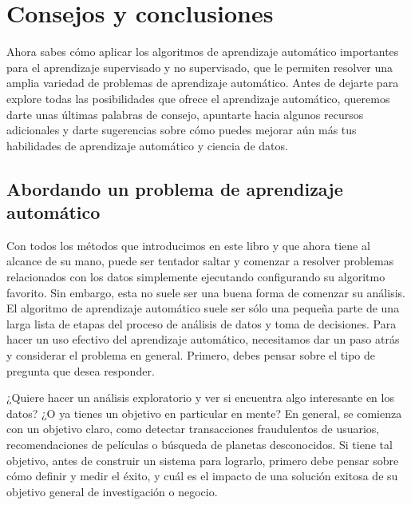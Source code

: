 


















\chapter{Consejos y conclusiones}


Ahora sabes cómo aplicar los algoritmos de aprendizaje automático importantes para el 
aprendizaje supervisado y no supervisado,  que le permiten resolver una amplia variedad 
de problemas de aprendizaje automático. Antes de dejarte para explore  todas las posibilidades 
que ofrece el aprendizaje automático, queremos darte unas últimas palabras de consejo, 
apuntarte hacia algunos recursos adicionales y darte sugerencias sobre cómo puedes
mejorar aún más tus habilidades de aprendizaje automático y ciencia de datos.\\



\section{Abordando un problema de aprendizaje automático}
	

Con todos los  métodos que introducimos  en este libro y que ahora tiene al alcance de su mano,
 puede ser tentador saltar y comenzar a resolver  problemas relacionados con los datos 
simplemente ejecutando configurando su algoritmo favorito. Sin embargo, esta no suele ser una buena forma de comenzar su análisis. El algoritmo de aprendizaje automático suele ser sólo una pequeña parte de 
 una larga lista de etapas del proceso de análisis de datos y toma de decisiones.
  Para hacer un uso efectivo del aprendizaje automático, necesitamos  dar un paso atrás y considerar el problema en general. Primero, debes  pensar sobre el tipo de pregunta que desea responder. 

¿Quiere hacer un análisis exploratorio y ver si encuentra algo interesante en los datos?
¿O ya tienes un objetivo en particular en mente?  
En general,   se comienza  con un objetivo claro, como detectar transacciones fraudulentos
 de usuarios, recomendaciones de películas o búsqueda de planetas desconocidos. 
 Si tiene tal objetivo, antes de construir un sistema para lograrlo, primero debe pensar
sobre cómo definir y medir el éxito, y cuál es el impacto de una solución exitosa
de su objetivo general de investigación o negocio.

